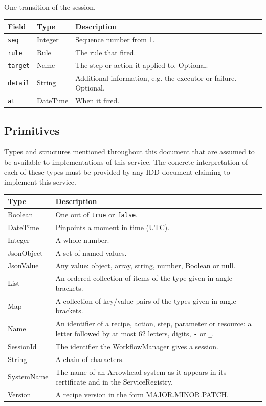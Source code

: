 \documentclass[a4paper]{arrowhead}
\newcommand{\mref}[1]{{\textcolor{ArrowheadPurple}{\hyperref[sec:model:#1]{#1}}}}
\newcommand{\pdef}[1]{{\textcolor{ArrowheadGrey}{#1\label{sec:model:primitives:#1}\label{sec:model:primitives:#1s}\label{sec:model:primitives:#1es}}}}
\newcommand{\pref}[1]{{\textcolor{ArrowheadGrey}{\hyperref[sec:model:primitives:#1]{#1}}}}
\begin{document}
One transition of the session.

{\small
\begin{longtable}{|p{3.9cm}|p{4.4cm}|p{7.5cm}|}

\hline
\rowcolor{gray!33} Field & Type & Description \\ \hline
\endhead
\texttt{seq} & \pref{Integer} & Sequence number from 1. \\ \hline
\texttt{rule} & \mref{Rule} & The rule that fired. \\ \hline
\texttt{target} & \pref{Name} & The step or action it applied to. Optional. \\ \hline
\texttt{detail} & \pref{String} & Additional information, e.g. the executor or failure. Optional. \\ \hline
\texttt{at} & \pref{DateTime} & When it fired. \\ \hline
\end{longtable}
}


\subsection{Primitives}
\label{sec:model:primitives}
Types and structures mentioned throughout this document that are assumed to be available to implementations of this
service. The concrete interpretation of each of these types must be provided by any IDD document claiming to implement
this service.

{\small
\begin{longtable}{|p{3.2cm}|p{12.6cm}|}

\hline
\rowcolor{gray!33} Type & Description \\ \hline
\endhead
\pdef{Boolean} & One out of \texttt{true} or \texttt{false}. \\ \hline
\pdef{DateTime} & Pinpoints a moment in time (UTC). \\ \hline
\pdef{Integer} & A whole number. \\ \hline
\pdef{JsonObject} & A set of named values. \\ \hline
\pdef{JsonValue} & Any value: object, array, string, number, Boolean or null. \\ \hline
\pdef{List} & An ordered collection of items of the type given in angle brackets. \\ \hline
\pdef{Map} & A collection of key/value pairs of the types given in angle brackets. \\ \hline
\pdef{Name} & An identifier of a recipe, action, step, parameter or resource: a letter followed by at most 62 letters, digits, \texttt{-} or \texttt{\_}. \\ \hline
\pdef{SessionId} & The identifier the WorkflowManager gives a session. \\ \hline
\pdef{String} & A chain of characters. \\ \hline
\pdef{SystemName} & The name of an Arrowhead system as it appears in its certificate and in the ServiceRegistry. \\ \hline
\pdef{Version} & A recipe version in the form MAJOR.MINOR.PATCH. \\ \hline
\end{longtable}
}
\end{document}
